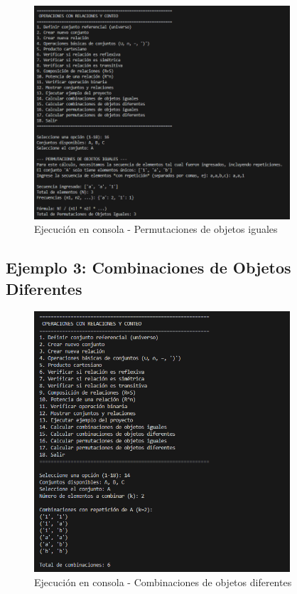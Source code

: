 \documentclass[12pt]{article}
\begin{document}
\begin{figure}[H]
    \centering
    \includegraphics[width=0.85\textwidth]{Foto2.png}
    \caption{Ejecución en consola - Permutaciones de objetos iguales}
\end{figure}

\subsection{Ejemplo 3: Combinaciones de Objetos Diferentes}

\begin{figure}[H]
    \centering
    \includegraphics[width=0.85\textwidth]{Foto3.png}
    \caption{Ejecución en consola - Combinaciones de objetos diferentes}
\end{figure}
\end{document}
